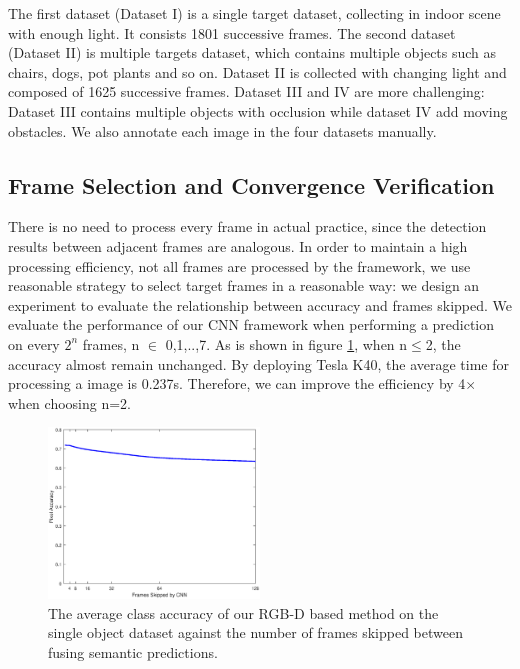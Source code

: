 \documentclass[conference]{IEEEtran}
\begin{document}
The first dataset (Dataset I) is a single target dataset, collecting in indoor scene with enough light. It consists 1801 successive frames. The second dataset (Dataset II) is multiple targets dataset, which contains multiple objects such as chairs, dogs, pot plants and so on. Dataset II is collected with changing light and composed of 1625 successive frames. Dataset III and IV are more challenging: Dataset III contains multiple objects with occlusion while dataset IV add moving obstacles. We also annotate each image in the four datasets manually. 

\subsection{\textbf{Frame Selection and Convergence {\color{blue}Verification}}}
There is no need to process every frame in actual practice, since the detection results between adjacent frames are analogous. In order to maintain a high processing efficiency, not all frames are processed by the framework, we use reasonable strategy to select target frames in a reasonable way: we design an experiment to evaluate the relationship between accuracy and frames skipped. We evaluate the performance of our CNN framework when performing a prediction on every $2^{n}$ frames, n $\in$ {0,1,..,7}. As is shown in figure \ref{fig:fig_keyframe}, when n$\leq$2, the accuracy almost remain unchanged. By deploying Tesla K40, the average time for processing a image is 0.237s. Therefore, we can improve the efficiency by 4$\times$ when choosing n=2. 

\begin{figure}[htbp]
	\centering
	\includegraphics[width=0.5\textwidth]{pic/key_frame.eps}
	\centering
	\caption{The average class accuracy of our RGB-D based method on the single object dataset against the number of frames skipped between fusing semantic predictions.}
	\label{fig:fig_keyframe}
\end{figure}
\end{document}
